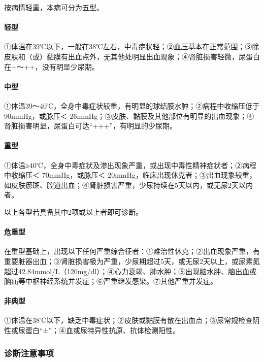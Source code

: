 按病情轻重，本病可分为五型。

\paragraph{轻型}

①体温在39℃以下，一般在38℃左右，中毒症状轻；②血压基本在正常范围；③除皮肤和（或）黏膜有出血点外，无其他处明显出血现象；④肾脏损害轻微，尿蛋白在+～++，没有明显少尿期。

\paragraph{中型}

①体温39～40℃，全身中毒症状较重，有明显的球结膜水肿；②病程中收缩压低于90mmHg，或脉压＜
26mmHg；③皮肤、黏膜及其他部位有明显的出血现象；④肾脏损害明显，尿蛋白可达“+++”，有明显的少尿期。

\paragraph{重型}

①体温≥40℃，全身中毒症状及渗出现象严重，或出现中毒性精神症状者；②病程中收缩压＜
70mmHg，或脉压＜
20mmHg，临床出现休克者；③出血现象较重，如皮肤瘀斑、腔道出血；④肾脏损害严重，少尿持续在5天以内，或无尿2天以内者。

以上各型若具备其中2项或以上者即可诊断。

\paragraph{危重型}

在重型基础上，出现以下任何严重综合征者：①难治性休克；②出血现象严重，有重要脏器出血；③肾脏损害极为严重，少尿期超过5天，或无尿2天以上，或尿素氮超过42.84mmol/L（120mg/dl）；④心力衰竭、肺水肿；⑤出现脑水肿、脑出血或脑疝等中枢神经系统并发症；⑥严重继发感染。⑦其他严重并发症。

\paragraph{非典型}

①体温在38℃以下，缺乏中毒症状；②皮肤或黏膜有散在出血点；③尿常规检查阴性或尿蛋白“±”；④血或尿特异性抗原、抗体检测阳性。

\subsubsection{诊断注意事项}

